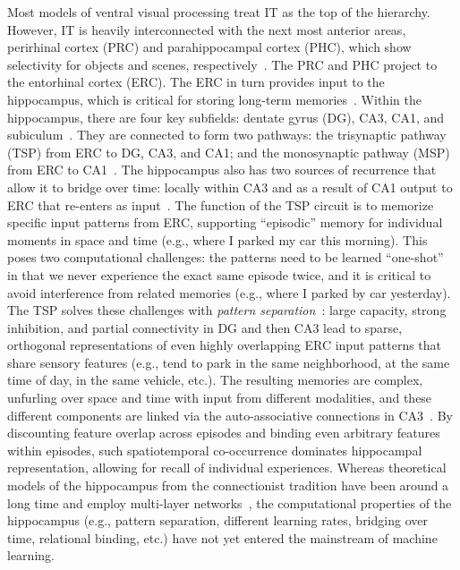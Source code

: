 Most models of ventral visual processing treat IT as the top of
the hierarchy. However, IT is heavily interconnected with
the next most anterior areas, perirhinal cortex (PRC) and
parahippocampal cortex (PHC), which show selectivity for
objects and scenes,
respectively~\citep{Barense:2010,Davachi:2006,Ranganath:2012}. The PRC
and PHC project to the entorhinal cortex (ERC). The ERC in turn
provides input to the hippocampus, which is critical for storing
long-term memories~\citep{Squire:1992}. Within the hippocampus, there
are four key subfields: dentate gyrus (DG), CA3, CA1, and
subiculum~\citep{Deng:2010,Shohamy:2013}. They are
connected to form two pathways: the trisynaptic pathway (TSP) from ERC
to DG, CA3, and CA1; and the monosynaptic pathway (MSP) from ERC to
CA1~\citep{Schapiro:2017}. The hippocampus also has two sources of
recurrence that allow it to bridge over time: locally within CA3 and
as a result of CA1 output to ERC that re-enters as
input~\citep{Kumaran:2016}. The function of the TSP circuit is to
memorize specific input patterns from ERC, supporting ``episodic''
memory for individual moments in space and time (e.g., where I parked
my car this morning). This poses two computational challenges: the
patterns need to be learned ``one-shot'' in that we never experience
the exact same episode twice, and it is critical to avoid interference
from related memories (e.g., where I parked by car yesterday). The TSP
solves these challenges with \textit{pattern
separation}~\citep{Leutgeb:2007,Yassa:2011,Rolls:2016}: large capacity,
strong inhibition, and partial connectivity in DG and then CA3 lead to
sparse, orthogonal representations of even highly overlapping ERC
input patterns that share sensory features (e.g., tend to park in
the same neighborhood, at the same time of day, in the same vehicle,
etc.). The resulting memories are complex, unfurling over space and
time with input from different modalities, and these different
components are linked via the auto-associative connections in
CA3~\citep{Wallenstein:1998}. By discounting feature overlap across
episodes and binding even arbitrary features within episodes, such
spatiotemporal co-occurrence dominates hippocampal representation, allowing for recall of individual experiences.
Whereas theoretical models of the hippocampus from the connectionist
tradition have been around a long time and employ multi-layer
networks~\citep{McClelland:1995,Norman:2003}, the computational
properties of the hippocampus (e.g., pattern separation, different
learning rates, bridging over time, relational binding, etc.) have not
yet entered the mainstream of machine learning.

